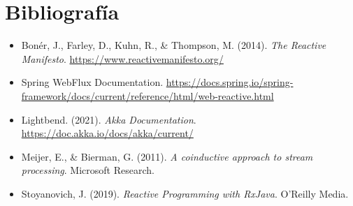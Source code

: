 \documentclass[12pt]{article}
\begin{document}
\section*{Bibliografía}
\begin{itemize}
    \item Bonér, J., Farley, D., Kuhn, R., \& Thompson, M. (2014). \textit{The Reactive Manifesto}. \url{https://www.reactivemanifesto.org/}
    \item Spring WebFlux Documentation. \url{https://docs.spring.io/spring-framework/docs/current/reference/html/web-reactive.html}
    \item Lightbend. (2021). \textit{Akka Documentation}. \url{https://doc.akka.io/docs/akka/current/}
    \item Meijer, E., \& Bierman, G. (2011). \textit{A coinductive approach to stream processing}. Microsoft Research.
    \item Stoyanovich, J. (2019). \textit{Reactive Programming with RxJava}. O'Reilly Media.
\end{itemize}
\end{document}
